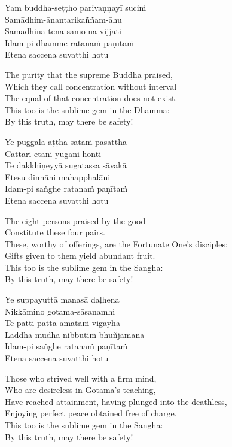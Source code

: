 Yam buddha-seṭṭho parivaṇṇayī suciṁ\\
Samādhim-ānantarikaññam-āhu\\
Samādhinā tena samo na vijjati\\
Idam-pi dhamme ratanaṁ paṇītaṁ\\
Etena saccena suvatthi hotu

\begin{english}
  The purity that the supreme Buddha praised,\\
  Which they call concentration without interval\\
  The equal of that concentration does not exist.\\
  This too is the sublime gem in the Dhamma:\\
  By this truth, may there be safety!
\end{english}

Ye puggalā aṭṭha sataṁ pasatthā\\
Cattāri etāni yugāni honti\\
Te dakkhiṇeyyā sugatassa sāvakā\\
Etesu dinnāni mahapphalāni\\
Idam-pi saṅghe ratanaṁ paṇītaṁ\\
Etena saccena suvatthi hotu

\begin{english}
  The eight persons praised by the good\\
  Constitute these four pairs.\\
  These, worthy of offerings, are the Fortunate One’s disciples;\\
  Gifts given to them yield abundant fruit.\\
  This too is the sublime gem in the Sangha:\\
  By this truth, may there be safety!
\end{english}

Ye suppayuttā manasā daḷhena\\
Nikkāmino gotama-sāsanamhi\\
Te patti-pattā amataṁ vigayha\\
Laddhā mudhā nibbutiṁ bhuñjamānā\\
Idam-pi saṅghe ratanaṁ paṇītaṁ\\
Etena saccena suvatthi hotu

\begin{english}
  Those who strived well with a firm mind,\\
  Who are desireless in Gotama’s teaching,\\
  Have reached attainment, having plunged into the deathless,\\
  Enjoying perfect peace obtained free of charge.\\
  This too is the sublime gem in the Sangha:\\
  By this truth, may there be safety!
\end{english}

